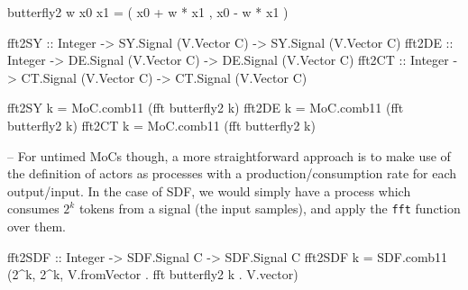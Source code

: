 \begin{code}
butterfly2 w x0 x1 = ( x0 + w * x1 ,  x0 - w * x1 )
\end{code}

\begin{code}
fft2SY  :: Integer -> SY.Signal (V.Vector C) -> SY.Signal (V.Vector C)
fft2DE  :: Integer -> DE.Signal (V.Vector C) -> DE.Signal (V.Vector C)
fft2CT  :: Integer -> CT.Signal (V.Vector C) -> CT.Signal (V.Vector C)
 
fft2SY k = MoC.comb11 (fft butterfly2 k)
fft2DE k = MoC.comb11 (fft butterfly2 k)
fft2CT k = MoC.comb11 (fft butterfly2 k)
\end{code}

-- For untimed MoCs though, a more straightforward approach is to make use of the definition of actors as processes with a production/consumption rate for each output/input. In the case of SDF, we would simply have a process which consumes $2^k$ tokens from a signal (the input samples), and apply the \texttt{fft} function over them.
  
\begin{code}
fft2SDF :: Integer -> SDF.Signal C -> SDF.Signal C
fft2SDF k = SDF.comb11 (2^k, 2^k, V.fromVector . fft butterfly2 k . V.vector)
\end{code}

